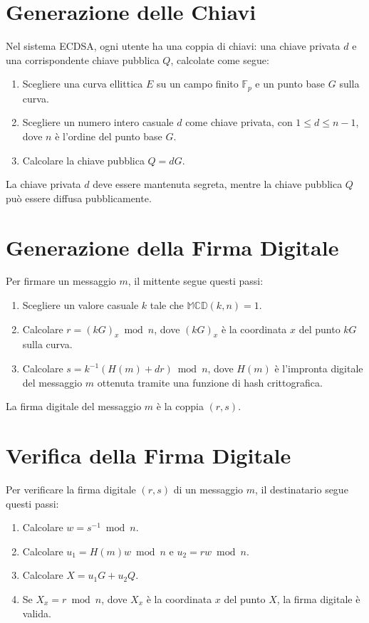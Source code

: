\documentclass[a4paper,12pt]{report}
\begin{document}
\section{Generazione delle Chiavi}
Nel sistema ECDSA, ogni utente ha una coppia di chiavi: una chiave privata $d$ e una corrispondente chiave pubblica $Q$, calcolate come segue:

\begin{enumerate}
    \item Scegliere una curva ellittica $E$ su un campo finito $\mathbb{F}_p$ e un punto base $G$ sulla curva.
    \item Scegliere un numero intero casuale $d$ come chiave privata, con $1 \leq d \leq n-1$, dove $n$ è l'ordine del punto base $G$.
    \item Calcolare la chiave pubblica $Q = dG$.
\end{enumerate}

La chiave privata $d$ deve essere mantenuta segreta, mentre la chiave pubblica $Q$ può essere diffusa pubblicamente.

\section{Generazione della Firma Digitale}
Per firmare un messaggio $m$, il mittente segue questi passi:

\begin{enumerate}
    \item Scegliere un valore casuale $k$ tale che \(\mathbb{MCD}(k,n)=1\).
    \item Calcolare $r = (kG)_x \bmod n$, dove $(kG)_x$ è la coordinata $x$ del punto $kG$ sulla curva.
    \item Calcolare $s = k^{-1}(H(m) + dr) \bmod n$, dove $H(m)$ è l'impronta digitale del messaggio $m$ ottenuta tramite una funzione di hash crittografica.
\end{enumerate}

La firma digitale del messaggio $m$ è la coppia $(r, s)$.

\section{Verifica della Firma Digitale}
Per verificare la firma digitale $(r, s)$ di un messaggio $m$, il destinatario segue questi passi:

\begin{enumerate}
    \item Calcolare $w = s^{-1} \bmod n$.
    \item Calcolare $u_1 = H(m)w \bmod n$ e $u_2 = rw \bmod n$.
    \item Calcolare $X = u_1G + u_2Q$.
    \item Se $X_x = r \bmod n$, dove $X_x$ è la coordinata $x$ del punto $X$, la firma digitale è valida.
\end{enumerate}
\end{document}
